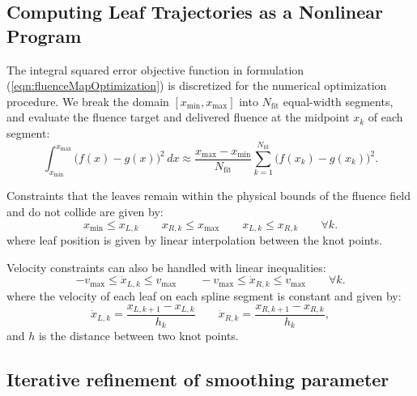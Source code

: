 \documentclass{iopart}
\begin{document}
\subsection{Computing Leaf Trajectories as a Nonlinear Program}
\label{sec:LeafTrajectoryAsNLP}

The integral squared error objective function in formulation (\ref{eqn:fluenceMapOptimization}) is discretized for the numerical optimization procedure. We break the domain $[x_\text{min}, x_\text{max}]$ into $N_\text{fit}$ equal-width segments, and evaluate the fluence target and delivered fluence at the midpoint $x_k$ of each segment:
\begin{equation}
  \int_{x_\text{min}}^{x_\text{max}} \! \bigg( f(x) - g(x) \bigg)^2 \,dx  \approx \frac{x_\text{max} - x_\text{min}}{N_\text{fit}}
  \sum_{k = 1}^{N_\text{fit}} \! \bigg( f(x_k) - g(x_k) \bigg)^2.
  \label{eqn:discreteFittingObjective}
\end{equation}

Constraints that the leaves remain within the physical bounds of the fluence field and do not collide are given by:
\begin{equation}
  x_\text{min} \leq x_{L, k}
  \quad \quad
  x_{R, k} \leq x_\text{max}
  \quad \quad
  x_{L, k} \leq x_{R, k}
  \quad \quad
  \forall k .
  \label{eqn:PositionLimits}
\end{equation}
\noindent where leaf position is given by linear interpolation between the knot points. 

Velocity constraints can also be handled with linear inequalities:
\begin{equation}
  -v_\text{max} \leq \dot{x}_{L, k} \leq v_\text{max}
  \quad \quad
  -v_\text{max} \leq \dot{x}_{R, k} \leq v_\text{max}
  \quad \quad \forall k .
  \label{eqn:VelocityLimits}
\end{equation}
\noindent  where the velocity of each leaf on each spline segment is constant and given by:
\begin{equation}
  \dot{x}_{L, k} = \frac{x_{L, k+1} - x_{L, k}}{h_k}
  \quad \quad
  \dot{x}_{R, k} = \frac{x_{R, k+1} - x_{R, k}}{h_k},
\end{equation}
\noindent and $h$ is the distance between two knot points. 


\subsection{Iterative refinement of smoothing parameter}
\end{document}
